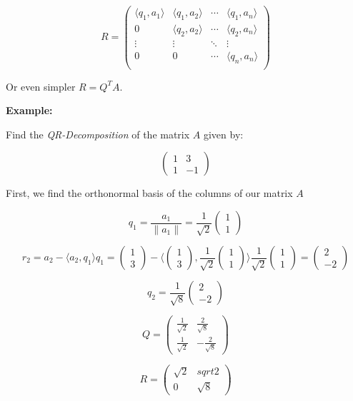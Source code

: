 \[
    R =
    \begin{pmatrix}
        \langle q_1, a_1 \rangle & \langle q_1, a_2 \rangle & \cdots &\langle q_1, a_n\rangle \\ 
        0 & \langle q_2, a_2 \rangle & \cdots & \langle q_2, a_n\rangle \\ 
        \vdots & \vdots  & \ddots & \vdots \\
        0 & 0  & \cdots & \langle q_n, a_n \rangle \\ 
    \end{pmatrix}
\]

Or even simpler \(R = Q^T A\).
\vspace{\baselineskip}

\textbf{Example:}
\vspace{\baselineskip}

Find the \emph{QR-Decomposition} of the matrix \(A\) given by:

\[
    \begin{pmatrix}
        1 & 3 \\
        1 & -1 
    \end{pmatrix}
\]

First, we find the orthonormal basis of the columns of our matrix \(A\) 

\[ 
    q_1 = \frac{a_1}{\|a_1\|} = \frac{1}{\sqrt{2}} \begin{pmatrix} 1 \\ 1 \end{pmatrix}
\]

\[ 
    r_2 = a_2 - \langle a_2, q_1\rangle q_1 
    = 
    \begin{pmatrix} 1 \\ 3 \end{pmatrix}
    - 
    \langle  
    \begin{pmatrix} 1 \\ 3 \end{pmatrix}
    ,
    \frac{1}{\sqrt{2}} \begin{pmatrix} 1 \\ 1 \end{pmatrix}
    \rangle    
    \frac{1}{\sqrt{2}} 
    \begin{pmatrix} 1 \\ 1 \end{pmatrix}
    = 
    \begin{pmatrix}
        2 \\ -2 
    \end{pmatrix}
\]

\[
    q_2 =
    \frac{1}{\sqrt{8}}
    \begin{pmatrix}
        2 \\ -2 
    \end{pmatrix}
\]

\[
    Q = 
    \begin{pmatrix}
        \frac{1}{\sqrt{2}} & \frac{2}{\sqrt{8}} \\
        \frac{1}{\sqrt{2}} & -\frac{2}{\sqrt{8}}
    \end{pmatrix}
\]

\[
    R =
    \begin{pmatrix}
        \sqrt{2} & sqrt{2} \\
        0    &    \sqrt{8}
    \end{pmatrix}
\]





